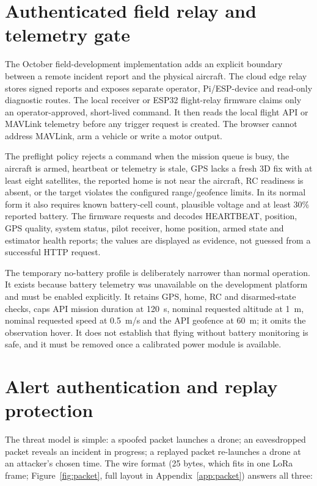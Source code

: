 \documentclass[12pt,a4paper]{report}
\begin{document}
\section{Authenticated field relay and telemetry gate}
\label{sec:field-relay}

The October field-development implementation adds an explicit boundary
between a remote incident report and the physical aircraft. The cloud
edge relay stores signed reports and exposes separate operator,
Pi/ESP-device and read-only diagnostic routes. The local receiver
 or ESP32 flight-relay
firmware claims only an operator-approved, short-lived command. It
then reads the local flight API or MAVLink telemetry before any trigger
request is created. The browser cannot address MAVLink, arm a vehicle
or write a motor output.

The preflight policy rejects a command when the mission queue is busy,
the aircraft is armed, heartbeat or telemetry is stale, GPS lacks a
fresh 3D fix with at least eight satellites, the reported home is not
near the aircraft, RC readiness is absent, or the target violates the
configured range/geofence limits. In its normal form it also requires
known battery-cell count, plausible voltage and at least 30\% reported
battery. The firmware requests and decodes HEARTBEAT,
position, GPS quality, system status, pilot receiver, home position,
armed state and estimator health reports; the
values are displayed as evidence, not guessed from a successful HTTP
request.

The temporary no-battery profile is deliberately narrower than normal
operation. It exists because battery telemetry was unavailable on the
development platform and must be enabled explicitly. It retains GPS,
home, RC and disarmed-state checks, caps API mission duration at
120~s, nominal requested altitude at 1~m, nominal requested speed at
0.5~m/s and the API geofence at 60~m; it omits the observation hover.
It does not establish that flying without battery monitoring is
safe, and it must be removed once a calibrated power module is
available.

\section{Alert authentication and replay protection}
\label{sec:packetsecurity}

The threat model is simple: a spoofed packet launches a drone; an
eavesdropped packet reveals an incident in progress; a replayed packet
re-launches a drone at an attacker's chosen time. The wire format
(25 bytes, which fits in one LoRa frame; Figure~\ref{fig:packet},
full layout in Appendix~\ref{app:packet}) answers all three:
\end{document}
